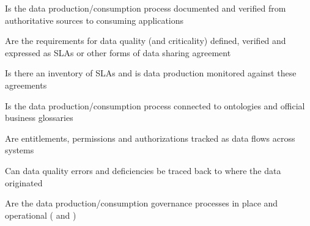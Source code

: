 \begin{core-questions}

  \item [\thesection.1] Is the data production/consumption process documented and verified from authoritative sources
                        to consuming applications
  \item [\thesection.2] Are the requirements for data quality (and criticality) defined, verified and expressed as SLAs
                        or other forms of data sharing agreement
  \item [\thesection.3] Is there an inventory of SLAs and is data production monitored against these agreements
  \item [\thesection.4] Is the data production/consumption process connected to ontologies and
                        official business glossaries
  \item [\thesection.5] Are entitlements, permissions and authorizations tracked as data flows across systems
  \item [\thesection.6] Can data quality errors and deficiencies be traced back to where the data originated
  \item [\thesection.7] Are the data production/consumption governance processes in place and operational
                        ( and )

\end{core-questions}

